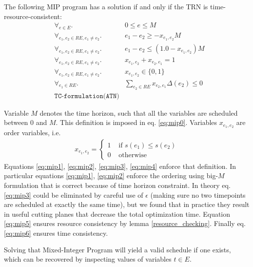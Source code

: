 The following MIP program has a solution if and only if the TRN is time-resource-consistent:
\begin{align}
\label{eq:mip0} & \forall_{e \in E}.              & 0 \leq e \leq M \\
\label{eq:mip1} & \forall_{e_1, e_2 \in RE, e_1 \neq e_2}. & e_1 - e_2 \geq - x_{e_1,e_2} M \\
\label{eq:mip2} & \forall_{e_1, e_2 \in RE, e_1 \neq e_2}. & e_1 - e_2 \leq (1.0 - x_{e_1,e_2}) M\\
\label{eq:mip3} & \forall_{e_1, e_2 \in RE, e_1 \neq e_2}. & x_{e_1,e_2} + x_{e_2,e_1}  = 1\\
\label{eq:mip4} & \forall_{e_1, e_2 \in RE, e_1 \neq e_2}. & x_{e_1,e_2} \in \{ 0, 1 \} \\
\label{eq:mip5} & \forall_{e_1 \in RE}.                    & \sum_{e_2 \in RE} x_{e_2, e_1} \Delta(e_2) \leq 0\\
\label{eq:mip6} & \texttt{TC-formulation(ATN)}
\end{align}

Variable $M$ denotes the time horizon, such that all the variables are scheduled between $0$ and $M$. This definition is imposed in eq. \ref{eq:mip0}.
Variables $x_{e_1,e_2}$ are order variables, i.e.
\begin{align*}
x_{e_1, e_2} = \begin{cases}
1 &\text{ if }s(e_1) \leq s(e_2) \\
0 &\text{ otherwise}
\end{cases}
\end{align*}
Equations \ref{eq:mip1}, \ref{eq:mip2}, \ref{eq:mip3}, \ref{eq:mip4} enforce that definition. In particular equations \ref{eq:mip1}, \ref{eq:mip2} enforce the ordering using big-$M$ formulation that is correct because of time horizon constraint. In theory eq. \ref{eq:mip3} could be eliminated by careful use of $\epsilon$ (making sure no two timepoints are scheduled at exactly the same time), but we found that in practice they result in useful cutting planes that decrease the total optimization time. Equation \ref{eq:mip5} ensures resource consistency by lemma \ref{resource_checking}. Finally eq. \ref{eq:mip6} ensures time consistency.

Solving that Mixed-Integer Program will yield a valid schedule if one exists, which can be recovered by inspecting values of variables $t \in E$.

